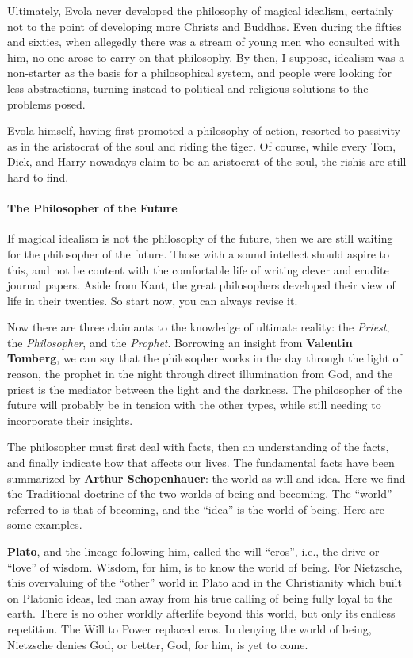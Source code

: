 Ultimately, Evola never developed the philosophy of magical idealism, certainly not to the point of developing more
Christs and Buddhas. Even during the fifties and sixties, when allegedly there was a stream of young men who consulted
with him, no one arose to carry on that philosophy. By then, I suppose, idealism was a non-starter as the basis for a
philosophical system, and people were looking for less abstractions, turning instead to political and religious
solutions to the problems posed.

Evola himself, having first promoted a philosophy of action, resorted to passivity as in the aristocrat of the soul and
riding the tiger. Of course, while every Tom, Dick, and Harry nowadays claim to be an aristocrat of the soul, the
rishis are still hard to find.

\paragraph{The Philosopher of the Future}
If magical idealism is not the philosophy of the future, then we are still waiting for the philosopher of the future.
Those with a sound intellect should aspire to this, and not be content with the comfortable life of writing clever and
erudite journal papers. Aside from Kant, the great philosophers developed their view of life in their twenties. So
start now, you can always revise it.

Now there are three claimants to the knowledge of ultimate reality: the \emph{Priest}, the \emph{Philosopher}, and the
\emph{Prophet}. Borrowing an insight from \textbf{Valentin Tomberg}, we can say that the philosopher works in the day
through the light of reason, the prophet in the night through direct illumination from God, and the priest is the
mediator between the light and the darkness. The philosopher of the future will probably be in tension with the other
types, while still needing to incorporate their insights.

The philosopher must first deal with facts, then an understanding of the facts, and finally indicate how that affects
our lives. The fundamental facts have been summarized by \textbf{Arthur Schopenhauer}: the world as will and idea. Here
we find the Traditional doctrine of the two worlds of being and becoming. The “world” referred to is that of becoming,
and the “idea” is the world of being. Here are some examples.

\textbf{Plato}, and the lineage following him, called the will “eros”, i.e., the drive or “love” of wisdom. Wisdom, for
him, is to know the world of being. For Nietzsche, this overvaluing of the “other” world in Plato and in the
Christianity which built on Platonic ideas, led man away from his true calling of being fully loyal to the earth. There
is no other worldly afterlife beyond this world, but only its endless repetition. The Will to Power replaced eros. In
denying the world of being, Nietzsche denies God, or better, God, for him, is yet to come.

